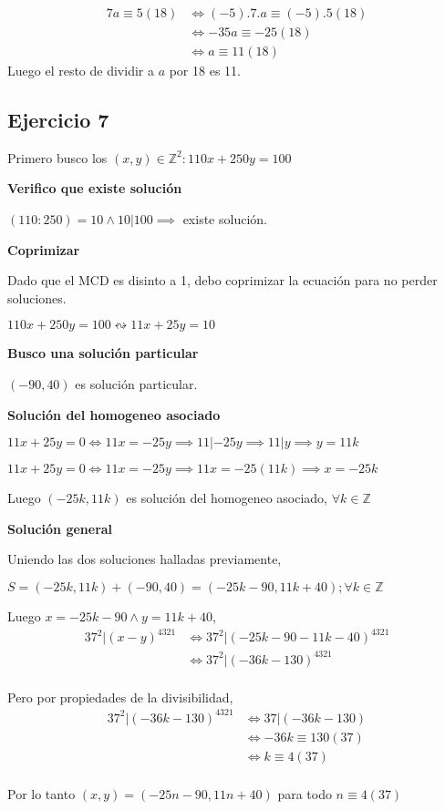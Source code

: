 \begin{align*}
    7a \equiv 5(18) &\iff (-5).7.a \equiv (-5).5(18) \\  
    &\iff -35a \equiv -25(18) \\
    &\iff a \equiv 11(18)
\end{align*}
Luego el resto de dividir a $a$ por 18 es 11.

\subsection{Ejercicio 7}
Primero busco los $ (x,y) \in \mathbb{Z}^2: 110x+250y=100 $

\textbf{Verifico que existe solución}

$ (110:250) = 10 \wedge 10|100 \implies $ existe solución.

\textbf{Coprimizar}

Dado que el MCD es disinto a 1, debo coprimizar la ecuación para no perder soluciones.

$ 110x+250y =100 \leftrightsquigarrow 11x+25y=10$

\textbf{Busco una solución particular}

$ (-90,40) $ es solución particular.

\textbf{Solución del homogeneo asociado}

$ 11x+25y = 0 \iff 11x = -25y \implies 11|-25y \implies 11|y \implies y=11k $

$ 11x+25y = 0 \iff 11x = -25y \implies 11x=-25(11k) \implies x = -25k $

Luego $ (-25k, 11k) $ es solución del homogeneo asociado, $ \forall k \in \mathbb{Z} $

\textbf{Solución general}

Uniendo las dos soluciones halladas previamente,

$ S = (-25k, 11k) + (-90,40) = (-25k-90, 11k+40); \forall k \in \mathbb{Z} $

Luego $ x = -25k-90 \wedge y= 11k+40 $,
\begin{align*}
    37^2 |(x-y)^{4321} &\iff 37^2 | (-25k-90-11k-40)^{4321} \\
    &\iff 37^2 | (-36k-130)^{4321} \\
\end{align*}

Pero por propiedades de la divisibilidad,
\begin{align*}
    37^2 | (-36k-130)^{4321} &\iff 37|(-36k-130) \\
    &\iff -36k \equiv 130(37) \\
    &\iff k \equiv 4(37) \\
\end{align*}

Por lo tanto $ (x, y) = (-25n-90, 11n+40) $ para todo $ n \equiv 4(37) $


